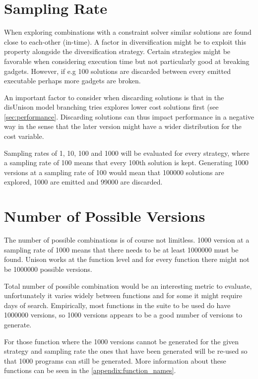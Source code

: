 \section{Sampling Rate}
\label{sec:sampling_rate}

When exploring combinations with a constraint solver similar solutions are found close to
each-other (in-time). A factor in diversification might be to exploit this property
alongside the diversification strategy. Certain strategies might be favorable when
considering execution time but not particularly good at breaking gadgets. However, if
e.g 100 solutions are discarded between every emitted executable perhaps more gadgets are
broken.

An important factor to consider when discarding solutions is that in the disUnison model
branching tries explores lower cost solutions first (see \ref{sec:performance}.
Discarding solutions can thus impact performance in a negative way in the sense that the
later version might have a wider distribution for the cost variable.

Sampling rates of 1, 10, 100 and 1000 will be evaluated for every strategy, where a
sampling rate of 100 means that every 100th solution is kept. Generating 1000 versions
at a sampling rate of 100 would mean that 100000 solutions are explored, 1000 are emitted
and 99000 are discarded.

\section{Number of Possible Versions}

The number of possible combinations is of course not limitless. 1000 version at a sampling
rate of 1000 means that there needs to be at least 1000000 must be found. Unison works
at the function level and for every function there might not be 1000000 possible versions.

Total number of possible combination would be an interesting metric to evaluate, unfortunately
it varies widely between functions and for some it might require days of search. Empirically,
most functions in the suite to be used do have 1000000 versions, so 1000 versions appears
to be a good number of versions to generate.

For those function where the 1000 versions cannot be generated for the given strategy and
sampling rate the ones that have been generated will be re-used so that 1000 programs can
still be generated. More information about these functions can be seen in the
\ref{appendix:function_names}.

